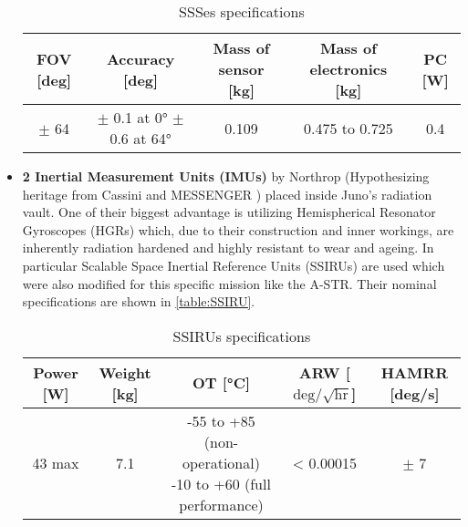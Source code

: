 \begin{itemize}
    \begin{table}[H]
        \renewcommand{\arraystretch}{1.3}
        \centering
        \small
        \begin{tabular}{|c|c|c|c|c|}
            \hline
            \textbf{FOV [deg]} & \textbf{Accuracy [deg]} & \textbf{Mass of sensor [kg]} & \textbf{Mass of electronics [kg]} & \textbf{PC [W]}\\
            \hline
            \hline
            $\pm$ 64 & \makecell{$\pm$ 0.1 at 0° \\  $\pm$ 0.6 at 64°} & 0.109 & 0.475 to 0.725 & 0.4 \\
            \hline
        \end{tabular}
        \caption{SSSes specifications}
        \label{table:sun_sensors}
    \end{table}
    \vspace*{-3mm}

    \item \textbf{2 Inertial Measurement Units (IMUs)} by Northrop (Hypothesizing heritage from Cassini \cite{gyro_evaluation} and MESSENGER \cite{messenger_imu}) placed inside Juno's radiation vault. One of their biggest advantage is utilizing Hemispherical Resonator Gyroscopes (HGRs) which, due to their construction and inner workings, are inherently radiation hardened and highly resistant to wear and ageing. In particular Scalable Space Inertial Reference Units (SSIRUs) \cite{SSIRU} are used which were also modified for this specific mission like the A-STR. Their nominal specifications are shown in \autoref{table:SSIRU}.
     
    \begin{table}[H]
        \renewcommand{\arraystretch}{1.3}
        \centering
        \small
        \begin{tabular}{|c|c|c|c|c|}
            \hline
            \textbf{Power [W]} & \textbf{Weight [kg]} & \textbf{OT [°C]} & \textbf{ARW [$\textrm{deg} / \sqrt{\textrm{hr}}$]} & \textbf{HAMRR [deg/s]} \\
            \hline
            \hline
            43 max & 7.1 & \makecell{-55 to +85 (non-operational) \\  -10 to +60 (full performance)} & < 0.00015 & $\pm$ 7 \\
            \hline
        \end{tabular}
        \caption{SSIRUs specifications}
        \label{table:SSIRU}
    \end{table}
\end{itemize}
\vspace*{-3mm}

